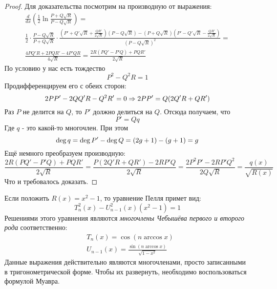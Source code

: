 \begin{proof}
	Для доказательства посмотрим на производную от выражения:
	\begin{multline*}
		\frac{d}{dx}\left(\frac{1}{2}\ln \frac{P + Q\sqrt{R}}{P - Q\sqrt{R}}\right) =
		\\
		\frac{1}{2} \cdot \frac{P - Q\sqrt{R}}{P + Q\sqrt{R}} \cdot \frac{\left(P' + Q'\sqrt{R} + \frac{QR'}{2\sqrt{R}}\right)(P - Q\sqrt{R}) - (P + Q\sqrt{R})\left(P' - Q'\sqrt{R} - \frac{QR'}{2\sqrt{R}}\right)}{(P - Q\sqrt{R})^2} =
		\\
		\frac{4PQ'R + 2PQR' - 4P'QR}{4\sqrt{R}} = \frac{2R(PQ' - P'Q) + PQR'}{2\sqrt{R}}
	\end{multline*}
	По условию у нас есть тождество
	\[
		P^2 - Q^2 R = 1
	\]
	Продифференцируем его с обеих сторон:
	\[
		2PP' - 2QQ'R - Q^2R' = 0 \Rightarrow 2PP' = Q(2Q'R + QR')
	\]
	Раз $P$ не делится на $Q$, то $P'$ должно делиться на $Q$. Отсюда получаем, что
	\[
		P' = Qq
	\]
	Где $q$ - это какой-то многочлен. При этом
	\[
		\operatorname{deg} q = \operatorname{deg} P' - \operatorname{deg} Q = (2g + 1) - (g + 1) = g
	\]
	Ещё немного преобразуем производную:
	\[
		\frac{2R(PQ' - P'Q) + PQR'}{2\sqrt{R}} = \frac{P(2Q'R + QR') - 2RP'Q}{2\sqrt{R}} = \frac{2P^2P' - 2RP'Q^2}{2Q\sqrt{R}} = \frac{q(x)}{\sqrt{R(x)}}
	\]
	Что и требовалось доказать.
\end{proof}

\begin{note}
	Если положить $R(x) = x^2 - 1$, то уравнение Пелля примет вид:
	\[
		T^2_n(x) - U^2_{n - 1}(x) (x^2 - 1) = 1
	\]
	Решениями этого уравнения являются \textit{многочлены Чебышёва первого и второго рода} соответственно:
	\begin{align*}
		&{T_n(x) = \cos(n \arccos x)}
		\\
		&{U_{n - 1}(x) = \frac{\sin(n \arccos x)}{\sqrt{1 - x^2}}}
	\end{align*}
	Данные выражения действительно являются многочленами, просто записанными в тригонометрической форме. Чтобы их развернуть, необходимо воспользоваться формулой Муавра.
\end{note}
